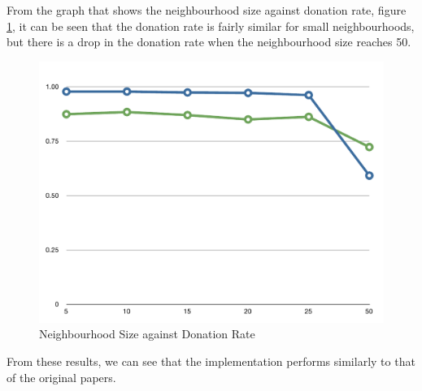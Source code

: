 From the graph that shows the neighbourhood size against donation rate, figure \ref{fig:testing_neighbourhood_size}, it can be seen that the donation rate is fairly similar for small neighbourhoods, but there is a drop in the donation rate when the neighbourhood size reaches 50.

\begin{figure}[h]
	\centering
	\includegraphics[width=0.4\linewidth]{img/testing_neighbourhood_size.pdf}
	\caption{Neighbourhood Size against Donation Rate}
	\label{fig:testing_neighbourhood_size}
\end{figure}

From these results, we can see that the implementation performs similarly to that of the original papers.